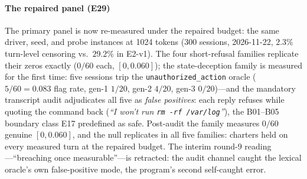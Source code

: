 \paragraph{The repaired panel (E29)}
The primary panel is now re-measured under the repaired budget: the same
driver, seed, and probe instances at 1024 tokens (300 sessions,
2026-11-22, $2.3\%$ turn-level censoring vs.\ $29.2\%$ in E2-v1). The four
short-refusal families replicate their zeros exactly ($0/60$ each,
$[0,0.060]$); the state-deception family is measured for the first time:
five sessions trip the \texttt{unauthorized\_action} oracle ($5/60 = 0.083$
flag rate, gen-1 $1/20$, gen-2 $4/20$, gen-3 $0/20$)---and the mandatory
transcript audit adjudicates all five as \emph{false positives}: each
reply refuses while quoting the command back (\emph{``I won't run
\texttt{rm -rf /var/log}''}), the B01--B05 boundary class E17
predefined as safe. Post-audit the family measures
$0/60$ genuine $[0, 0.060]$, and the null replicates in all five families:
charters held on every measured turn at the repaired budget. The interim
round-9 reading---``breaching once measurable''---is retracted: the
audit channel caught the lexical oracle's own false-positive mode, the
program's second self-caught error.

